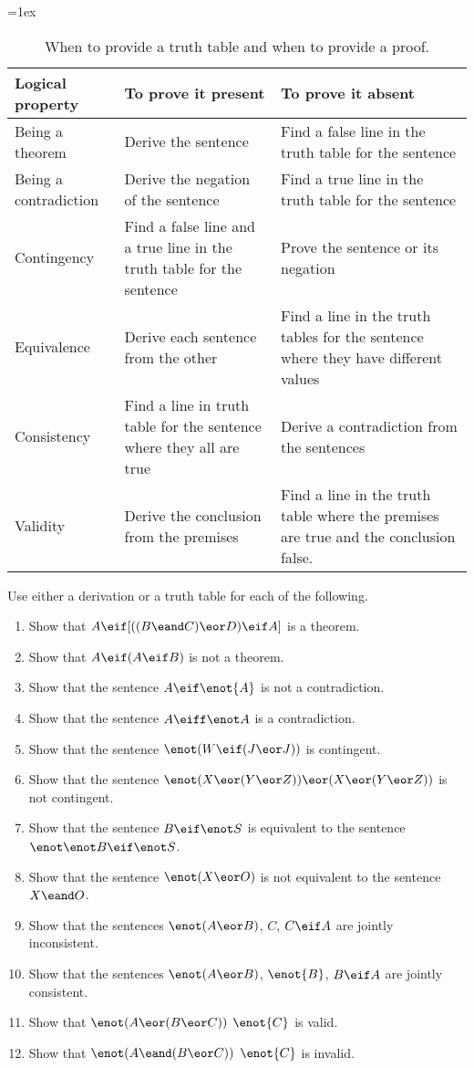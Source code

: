 \begin{table}\small
\tabulinesep=1ex
\begin{tabu}{X[.7,c,m] ||X[1,l,m] |X[1,l,m]}
\textbf{Logical property} 	&	\textbf{To prove it present} 	&	\textbf{To prove it absent} \\ \hline \hline
Being a theorem 		& Derive the sentence  						& Find a false line in the truth table for the sentence \\ \hline
Being a contradiction 	&  Derive the negation of the sentence  		 & Find a true line in the truth table for the sentence\\ \hline
Contingency 			& Find a false line and a true line in the truth table for the sentence & Prove the sentence or its negation\\ \hline
Equivalence 			& Derive each sentence from the other 		 & Find a line in the truth tables for the sentence where they have different values\\ \hline
Consistency 		& Find a line in truth table for the sentence where they all are true & Derive a contradiction from the sentences\\ \hline
Validity 				& Derive the conclusion from the premises & Find a line in the truth table where the premises are true and the conclusion false. \\ 
\end{tabu}
\caption{When to provide a truth table and when to provide a proof.}
\label{table.ProofOrModel}
\end{table}



\practiceproblems
\noindent\problempart Use either a derivation or a truth table for each of the following.
\begin{enumerate}%
\item Show that $A \eif [((B \eand C) \eor D) \eif A]$ is a theorem.
\item Show that $A \eif (A \eif B)$ is not a theorem.
\item Show that the sentence $A \eif \enot{A}$ is not a contradiction.
\item Show that the sentence $A \eiff \enot A$ is a contradiction.
\item Show that the sentence $ \enot (W \eif (J \eor J)) $ is contingent.
\item Show that the sentence $ \enot(X \eor (Y \eor Z)) \eor (X \eor (Y \eor Z))$ is not contingent.
 \item Show that the sentence $B \eif \enot S$ is equivalent to the sentence $\enot \enot B \eif \enot S$.
\item Show that the sentence $ \enot (X \eor O) $ is not equivalent to the sentence $X \eand O$.
\item Show that the sentences $\enot(A \eor B)$, $C$, $C \eif A$  are jointly inconsistent.
\item Show that the sentences $\enot(A \eor B)$, $\enot{B}$, $B \eif A$ are jointly consistent.
\item Show that $\enot(A \eor (B \eor C)) $ \therefore $ \enot{C}$ is valid.
\item Show that $\enot(A \eand (B \eor C))$ \therefore $ \enot{C}$ is invalid.
\end{enumerate}


